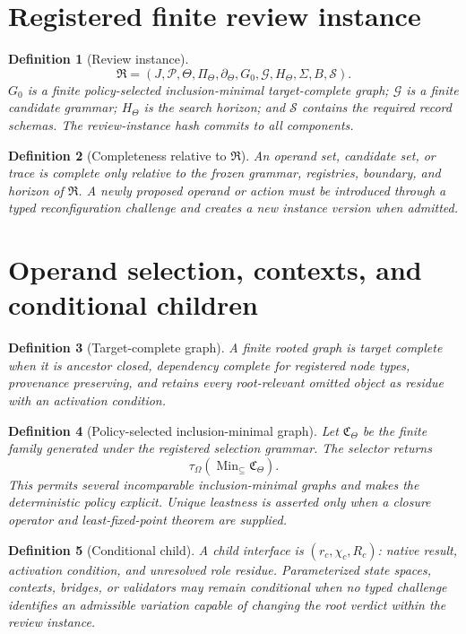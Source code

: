\documentclass[10pt]{article}
\newtheorem{definition}{Definition}[section]
\newcommand{\Config}{\Sigma}
\newcommand{\Target}{\Theta}
\begin{document}
\section{Registered finite review instance}

\begin{definition}[Review instance]
\[
\mathfrak R=(J,\mathcal P,\Target,\Pi_\Target,\partial_\Target,
G_0,\mathcal G,H_\Target,\Config,B,\mathcal S).
\]
$G_0$ is a finite policy-selected inclusion-minimal target-complete graph; $\mathcal G$ is a finite candidate grammar; $H_\Target$ is the search horizon; and $\mathcal S$ contains the required record schemas.  The review-instance hash commits to all components.
\end{definition}

\begin{definition}[Completeness relative to $\mathfrak R$]
An operand set, candidate set, or trace is complete only relative to the frozen grammar, registries, boundary, and horizon of $\mathfrak R$.  A newly proposed operand or action must be introduced through a typed reconfiguration challenge and creates a new instance version when admitted.
\end{definition}

\section{Operand selection, contexts, and conditional children}

\begin{definition}[Target-complete graph]
A finite rooted graph is target complete when it is ancestor closed, dependency complete for registered node types, provenance preserving, and retains every root-relevant omitted object as residue with an activation condition.
\end{definition}

\begin{definition}[Policy-selected inclusion-minimal graph]
Let $\mathfrak C_\Target$ be the finite family generated under the registered selection grammar.  The selector returns
\[
\tau_\Omega(\operatorname{Min}_{\subseteq}\mathfrak C_\Target).
\]
This permits several incomparable inclusion-minimal graphs and makes the deterministic policy explicit.  Unique leastness is asserted only when a closure operator and least-fixed-point theorem are supplied.
\end{definition}

\begin{definition}[Conditional child]
A child interface is $(r_c,\chi_c,R_c)$: native result, activation condition, and unresolved role residue.  Parameterized state spaces, contexts, bridges, or validators may remain conditional when no typed challenge identifies an admissible variation capable of changing the root verdict within the review instance.
\end{definition}
\end{document}

